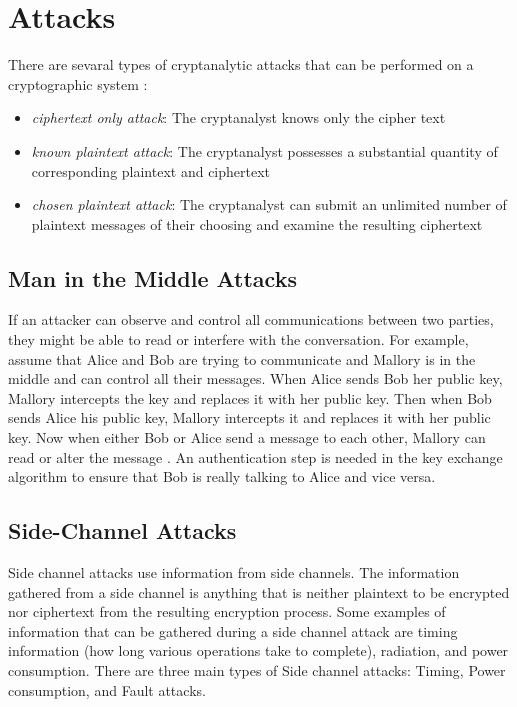 \documentclass[12pt]{article}
\begin{document}
\section{Attacks}

There are sevaral types of cryptanalytic attacks that can be performed on a cryptographic system \cite{diffiehellman}:
\begin{itemize}
	\item{\textit{ciphertext only attack}: The cryptanalyst knows only the cipher text}
	\item{\textit{known plaintext attack}: The cryptanalyst possesses a substantial quantity of corresponding plaintext and ciphertext}
	\item{\textit{chosen plaintext attack}: The cryptanalyst can submit an unlimited number of plaintext messages of their choosing and examine the resulting ciphertext}
\end{itemize}

\subsection{Man in the Middle Attacks}
If an attacker can observe and control all communications between two parties, they might be able to read or interfere with the conversation. For example, assume that Alice and Bob are trying to communicate and Mallory is in the middle and can control all their messages. When Alice sends Bob her public key, Mallory intercepts the key and replaces it with her public key. Then when Bob sends Alice his public key, Mallory intercepts it and replaces it with her public key. Now when either Bob or Alice send a message to each other, Mallory can read or alter the message \cite[pg. 48]{appcrypt}. An authentication step is needed in the key exchange algorithm to ensure that Bob is really talking to Alice and vice versa.

\subsection{Side-Channel Attacks}
Side channel attacks use information from side channels. The information gathered from a side channel is anything that is neither plaintext to be encrypted nor ciphertext from the resulting encryption process. Some examples of information that can be gathered during a side channel attack are timing information (how long various operations take to complete), radiation, and power consumption. There are three main types of Side channel attacks: Timing, Power consumption, and Fault attacks\cite[pg. 2-3]{sidechannel}.
\end{document}
